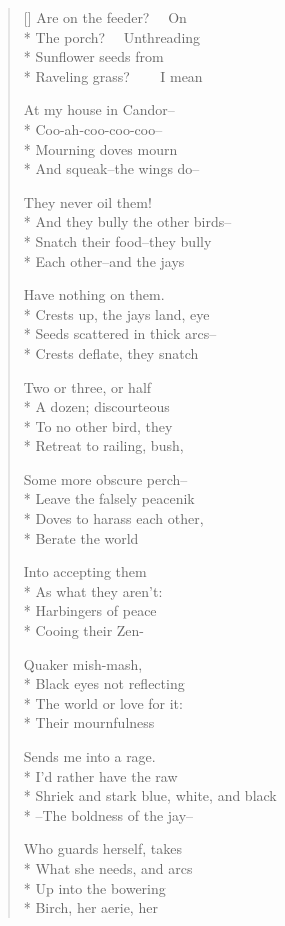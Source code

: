 \label{ch:what_birds}
\settowidth{\versewidth}{Shriek and stark blue, white, and black}
\begin{verse}[\versewidth]
Are on the feeder?   On\\*
The porch?   Unthreading\\*
Sunflower seeds from\\*
Raveling grass?     I mean

At my house in Candor--\\*
Coo-ah-coo-coo-coo--\\*
Mourning doves mourn\\*
And squeak--the wings do--

They never oil them!\\*
And they bully the other birds--\\*
Snatch their food--they bully\\*
Each other--and the jays

Have nothing on them.\\*
Crests up, the jays land, eye\\*
Seeds scattered in thick arcs--\\*
Crests deflate, they snatch

Two or three, or half\\*
A dozen; discourteous\\*
To no other bird, they\\*
Retreat to railing, bush,

Some more obscure perch--\\*
Leave the falsely peacenik\\*
Doves to harass each other,\\*
Berate the world

Into accepting them\\*
As what they aren't:\\*
Harbingers of peace\\*
Cooing their Zen-

Quaker mish-mash,\\*
Black eyes not reflecting\\*
The world or love for it:\\*
Their mournfulness

Sends me into a rage.\\*
I'd rather have the raw\\*
Shriek and stark blue, white, and black\\*
--The boldness of the jay--

Who guards herself, takes\\*
What she needs, and arcs\\*
Up into the bowering\\*
Birch, her aerie, her


\end{verse}
